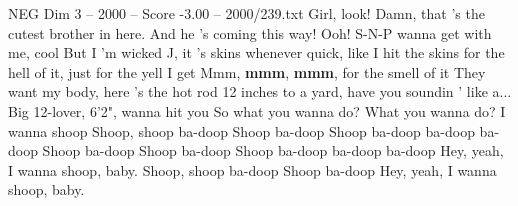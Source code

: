 \begin{textsample}{NEG Dim 3 – 2000 – Score -3.00 – 2000/239.txt}
Girl, look!
Damn, that 's the cutest brother in here.
And he 's coming this way!
Ooh!
S-N-P wanna get with me, cool But I 'm wicked J, it 's skins whenever quick, like I hit the skins for the hell of it, just for the yell I get Mmm, \textbf{mmm}, \textbf{mmm}, for the smell of it They want my body, here 's the hot rod 12 inches to a yard, have you soundin ' like a...
Big 12-lover, 6'2", wanna hit you So what you wanna do?
What you wanna do?
I wanna shoop Shoop, shoop ba-doop Shoop ba-doop Shoop ba-doop ba-doop ba-doop Shoop ba-doop Shoop ba-doop Shoop ba-doop ba-doop ba-doop Hey, yeah, I wanna shoop, baby.
Shoop, shoop ba-doop Shoop ba-doop Hey, yeah, I wanna shoop, baby.

\end{textsample}
